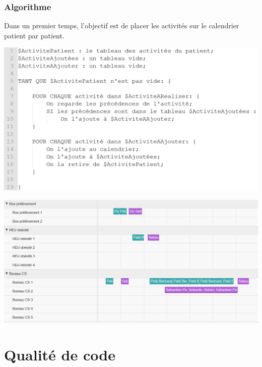 \documentclass{beamer}
\begin{document}
\begin{frame}
\frametitle{Algorithme}

Dans un premier temps, l'objectif est de placer les activités sur le calendrier patient par patient.

\begin{center}
	\includegraphics[scale=0.4]{images/algoPlanAuto}
\end{center}

\end{frame}

\begin{frame}

\begin{center}
	\includegraphics[scale=0.27]{images/exemple_calendrier2}
\end{center}

\end{frame}


\section{Qualité de code}
\end{document}

